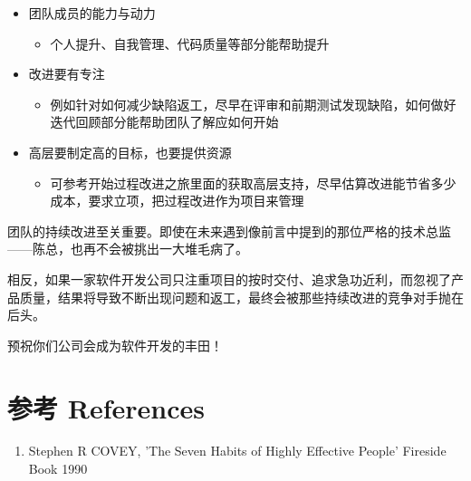 \begin{itemize}
\tightlist
\item
  团队成员的能力与动力

  \begin{itemize}
  \tightlist
  \item
    个人提升、自我管理、代码质量等部分能帮助提升
  \end{itemize}
\item
  改进要有专注

  \begin{itemize}
  \tightlist
  \item
    例如针对如何减少缺陷返工，尽早在评审和前期测试发现缺陷，如何做好迭代回顾部分能帮助团队了解应如何开始
  \end{itemize}
\item
  高层要制定高的目标，也要提供资源

  \begin{itemize}
  \tightlist
  \item
    可参考开始过程改进之旅里面的获取高层支持，尽早估算改进能节省多少成本，要求立项，把过程改进作为项目来管理
  \end{itemize}
\end{itemize}

团队的持续改进至关重要。即使在未来遇到像前言中提到的那位严格的技术总监——陈总，也再不会被挑出一大堆毛病了。

相反，如果一家软件开发公司只注重项目的按时交付、追求急功近利，而忽视了产品质量，结果将导致不断出现问题和返工，最终会被那些持续改进的竞争对手抛在后头。

预祝你们公司会成为软件开发的丰田！


\hypertarget{ux53c2ux8003-references}{%
\section{参考 References}\label{ux53c2ux8003-references}}

\begin{enumerate}
\tightlist
\item
  Stephen R COVEY, 'The Seven Habits of Highly Effective People' Fireside Book 1990
\end{enumerate}

